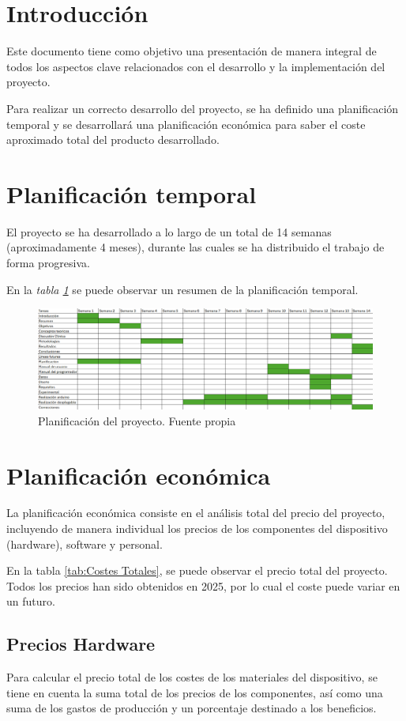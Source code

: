 \section{Introducción}
Este documento tiene como objetivo una presentación de manera integral de todos los aspectos clave relacionados con el desarrollo y la implementación del proyecto. 

Para realizar un correcto desarrollo del proyecto, se ha definido una planificación temporal y se desarrollará una planificación económica para saber el coste aproximado total del producto desarrollado.
\section{Planificación temporal}
El proyecto se ha desarrollado a lo largo de un total de 14 semanas (aproximadamente 4 meses), durante las cuales se ha distribuido el trabajo de forma progresiva. 

En la \textit{tabla \ref{fig:Planificación}} se puede observar un resumen de la planificación temporal.
\begin{figure}[h]
        \centering
        \includegraphics[width=1.25\textwidth]{img/planificación.png}
        \caption{Planificación del proyecto. Fuente propia}
        \label{fig:Planificación}
    \end{figure}

\section{Planificación económica}

La planificación económica consiste en el análisis total del precio del proyecto, incluyendo de manera individual los precios de los componentes del dispositivo (hardware), software y personal.

En la tabla \ref{tab:Costes Totales}, se puede observar el precio total del proyecto. Todos los precios han sido obtenidos en 2025, por lo cual el coste puede variar en un futuro. 

\subsection{Precios Hardware}
Para calcular el precio total de los costes de los materiales del dispositivo, se tiene en cuenta la suma total de los precios de los componentes, así como una suma de los gastos de producción y un porcentaje destinado a los beneficios. 

